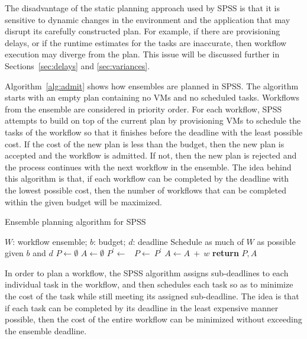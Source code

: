 \documentclass[conference]{IEEEtran}
\begin{document}
The disadvantage of the static planning approach used by SPSS is that it is sensitive to dynamic changes in the environment and the application that may disrupt its carefully constructed plan. For example, if there are provisioning delays, or if the runtime estimates for the tasks are inaccurate, then workflow execution may diverge from the plan. This issue will be discussed further in Sections~\ref{sec:delays} and \ref{sec:variances}.

Algorithm~\ref{alg:admit} shows how ensembles are planned in SPSS. The algorithm starts with an empty plan containing no VMs and no scheduled tasks. Workflows from the ensemble are considered in priority order. For each workflow, SPSS attempts to build on top of the current plan by provisioning VMs to schedule the tasks of the workflow so that it finishes before the deadline with the least possible cost. If the cost of the new plan is less than the budget, then the new plan is accepted and the workflow is admitted. If not, then the new plan is rejected and the process continues with the next workflow in the ensemble. The idea behind this algorithm is that, if each workflow can be completed by the deadline with the lowest possible cost, then the number of workflows that can be completed within the given budget will be maximized.

\begin{algorithm}[tb]
\caption{Ensemble planning algorithm for SPSS}
\label{alg:admit}
\begin{algorithmic}[1]
\Require $W$: workflow ensemble; $b$: budget; $d$: deadline
\Ensure Schedule as much of $W$ as possible given $b$ and $d$
    \State $P\gets \emptyset$ 
    \State $A\gets \emptyset$ 
        \State $P^\prime \gets$\ 
            \State $P\gets\ P^\prime$ 
            \State $A \gets A\ +\ w$ 
        \EndIf
    \EndFor
    \State \textbf{return} $P,A$
\EndProcedure
\end{algorithmic}
\end{algorithm}

In order to plan a workflow, the SPSS algorithm assigns sub-deadlines to each individual task in the workflow, and then schedules each task so as to minimize the cost of the task while still meeting its assigned sub-deadline. The idea is that if each task can be completed by its deadline in the least expensive manner possible, then the cost of the entire workflow can be minimized without exceeding the ensemble deadline.
\end{document}
